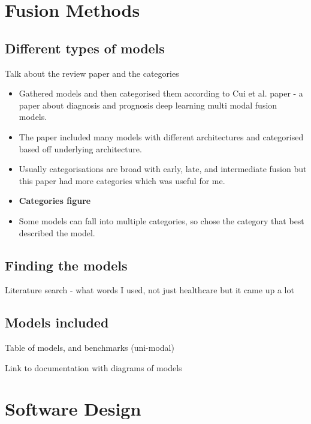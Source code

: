\section{Fusion Methods}

\subsection{Different types of models}

Talk about the review paper and the categories

\begin{itemize}
    \item Gathered models and then categorised them according to Cui et al. paper - a paper about diagnosis and prognosis deep learning multi modal fusion models.
    \item The paper included many models with different architectures and categorised based off underlying architecture.
    \item Usually categorisations are broad with early, late, and intermediate fusion but this paper had more categories which was useful for me.
    \item \textbf{Categories figure}
    \item Some models can fall into multiple categories, so chose the category that best described the model.
\end{itemize}


\subsection{Finding the models}
Literature search - what words I used, not just healthcare but it came up a lot 

\subsection{Models included}

Table of models, and benchmarks (uni-modal)

Link to documentation with diagrams of models

\section{Software Design}

